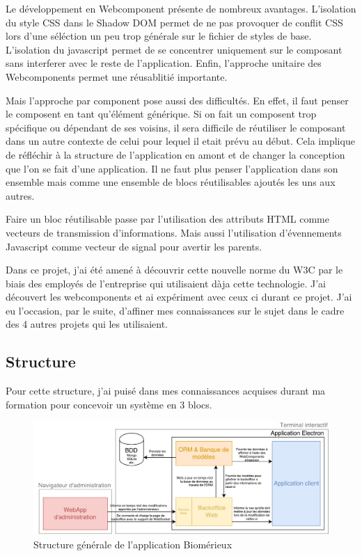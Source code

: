 \bigskip

Le développement en Webcomponent présente de nombreux avantages.
L'isolation du style CSS dans le Shadow DOM permet de ne pas provoquer de conflit CSS lors d'une séléction un peu trop générale sur le fichier de styles de base.
L'isolation du javascript permet de se concentrer uniquement sur le composant sans interferer avec le reste de l'application.
Enfin, l'approche unitaire des Webcomponents permet une réusablitié importante.

Mais l'approche par component pose aussi des difficultés.
En effet, il faut penser le composent en tant qu'élément générique.
Si on fait un composent trop spécifique ou dépendant de ses voisins, il sera difficile de réutiliser le composant dans un autre contexte de celui pour lequel il etait prévu au début.
Cela implique de réfléchir à la structure de l'application en amont et de changer la conception que l'on se fait d'une application.
Il ne faut plus penser l'application dans son ensemble mais comme une ensemble de blocs réutilisables ajoutés les uns aux autres.

Faire un bloc réutilisable passe par l'utilisation des attributs HTML comme vecteurs de transmission d'informations.
Mais aussi l'utilisation d'évennements Javascript comme vecteur de signal pour avertir les parents.

\bigskip

Dans ce projet, j'ai été amené à découvrir cette nouvelle norme du W3C par le biais des employés de l'entreprise qui utilisaient dàja cette technologie.
J'ai découvert les webcomponents et ai expériment avec ceux ci durant ce projet.
J'ai eu l'occasion, par le suite, d'affiner mes connaissances sur le sujet dans le cadre des 4 autres projets qui les utilisaient.

\subsection{Structure}

Pour cette structure, j'ai puisé dans mes connaissances acquises durant ma formation pour concevoir un système en 3 blocs.

\begin{figure}[h]
    \centering
    \includegraphics[scale=0.6]{img/Proposition-utopia.pdf}
    \caption{Structure générale de l'application Biomérieux}
\end{figure}

